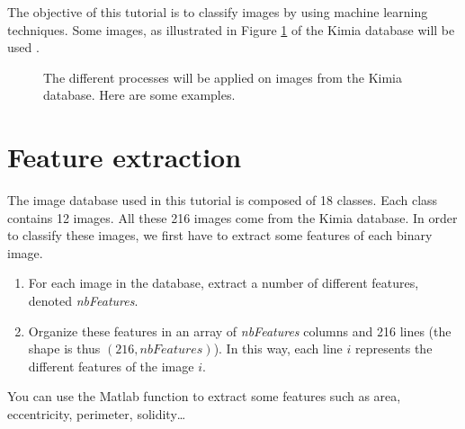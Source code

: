 \def\difficulty{2}

\vspace*{10pt}
\begin{note}The objective of this tutorial is to classify images by using machine learning techniques. Some images, as illustrated in Figure \ref{fig:machine_learning:enonce:examples} of the Kimia database will be used \cite{KimiaDB,Sharvit1998}.\end{note}

\begin{figure}[H]
\centering\caption{The different processes will be applied on images from the Kimia database. Here are some examples.}%
\hfill
{}
\hfill
{}
\hfill
{}%
\label{fig:machine_learning:enonce:examples}\vspace*{-10pt}%
\end{figure}


\section{Feature extraction}
The image database used in this tutorial is composed of 18 classes. Each class contains 12 images. All these 216 images come from the Kimia database. In order to classify these images, we first have to extract some features of each binary image. 


\begin{qbox}
\begin{enumerate}
	\item For each image in the database, extract a number of different features, denoted \textsl{nbFeatures}.
	\item Organize these features in an array of \textsl{nbFeatures} columns and 216 lines (the shape is thus $(216,nbFeatures)$). In this way, each line $i$ represents the different features of the image $i$.
\end{enumerate}
\end{qbox}

\begin{mcomment}
\begin{mremark}
You can use the Matlab function  to extract some features such as area, eccentricity, perimeter, solidity\dots
\end{mremark}
\end{mcomment}

